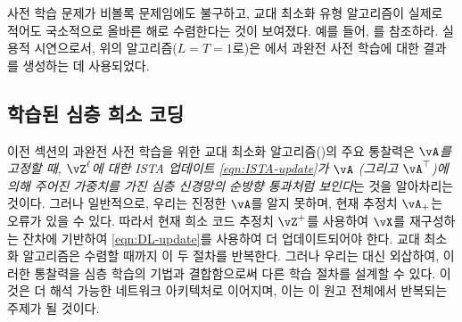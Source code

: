 \documentclass[../../book-main_ko.tex]{subfiles}
\begin{document}
사전 학습 문제가 비볼록 문제임에도 불구하고, 교대 최소화 유형 알고리즘이 실제로 적어도 국소적으로 올바른 해로 수렴한다는 것이 보여졌다. 예를 들어, \cite{alekh-2016}를 참조하라. 실용적 시연으로서, 위의 알고리즘($L = T = 1$로)은 에서 과완전 사전 학습에 대한 결과를 생성하는 데 사용되었다.

\subsection{학습된 심층 희소 코딩}
\label{sec:LISTA}
이전 섹션의 과완전 사전 학습을 위한 교대 최소화 알고리즘()의 주요 통찰력은 \textit{\(\vA\)를 고정할 때, $\vZ^\ell$에 대한 ISTA 업데이트 \eqref{eqn:ISTA-update}가 \(\vA\) (그리고 \(\vA^{\top}\))에 의해 주어진 가중치를 가진 심층 신경망의 순방향 통과처럼 보인다}는 것을 알아차리는 것이다. 그러나 일반적으로, 우리는 진정한 $\vA$를 알지 못하며, 현재 추정치 $\vA_+$는 오류가 있을 수 있다. 따라서 현재 희소 코드 추정치 $\vZ^+$를 사용하여 $\vX$를 재구성하는 잔차에 기반하여 \eqref{eqn:DL-update}를 사용하여 더 업데이트되어야 한다. 교대 최소화 알고리즘은 수렴할 때까지 이 두 절차를 반복한다. 그러나 우리는 대신 외삽하여, 이러한 통찰력을 심층 학습의 기법과 결합함으로써 다른 학습 절차를 설계할 수 있다. 이것은 더 해석 가능한 네트워크 아키텍처로 이어지며, 이는 이 원고 전체에서 반복되는 주제가 될 것이다.
\end{document}
